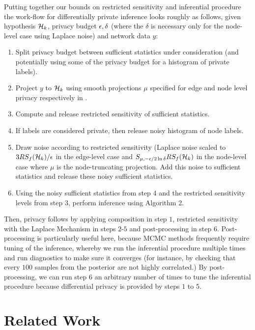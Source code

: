Putting together our bounds on restricted sensitivity and inferential procedure the work-flow for differentially private inference looks roughly as follows, given hypothesis $\mathcal{H}_k$, privacy budget $\epsilon, \delta$ (where the $\delta$ is necessary only for the node-level case using Laplace noise) and network data $y$:

\begin{enumerate}
	\item Split privacy budget between sufficient statistics under consideration (and potentially using some of the privacy budget for a histogram of private labels).
	\item Project $y$ to $\mathcal{H}_k$ using smooth projections $\mu$ specified for edge and node level privacy respectively in .
	\item Compute and release restricted sensitivity of sufficient statistics.
	\item If labels are considered private, then release noisy histogram of node labels.
	\item Draw noise according to restricted sensitivity (Laplace noise scaled to $3RS_f(\mathcal{H}_k)/\epsilon$ in the edge-level case and $S_{\mu, -\epsilon/2\ln\delta} RS_f(\mathcal{H}_k)$ in the node-level case where $\mu$ is the node-truncating projection. Add this noise to sufficient statistics and release these noisy sufficient statistics.
	\item Using the noisy sufficient statistics from step 4 and the restricted sensitivity levels from step 3, perform inference using Algorithm 2. 
\end{enumerate}

Then, privacy follows by applying composition in step $1$, restricted sensitivity with the Laplace Mechanism in steps $2$-$5$ and post-processing in step $6$. Post-processing is particularly useful here, because MCMC methods frequently require tuning of the inference, whereby we run the inferential procedure multiple times and run diagnostics to make sure it converges (for instance, by checking that every $100$ samples from the posterior are not highly correlated.) By post-processing, we can run step $6$ an arbitrary number of times to tune the inferential procedure because differential privacy is provided by steps $1$ to $5$.

\section{Related Work}\label{sec:rel_work}

